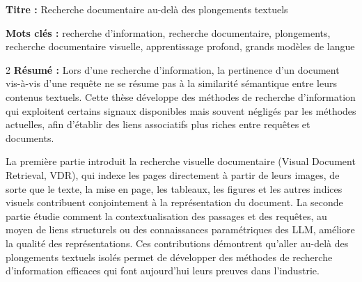 \begin{mdframed}[linecolor=Prune,linewidth=1]
\textbf{Titre :} Recherche documentaire au-delà des plongements textuels

\noindent \textbf{Mots clés :} recherche d'information, recherche documentaire, plongements, recherche documentaire visuelle, apprentissage profond, grands modèles de langue

\begin{multicols}{2}
\noindent \textbf{Résumé :} Lors d'une recherche d’information, la pertinence d’un document vis-à-vis d’une requête ne se résume pas à la similarité sémantique entre leurs contenus textuels. Cette thèse développe des méthodes de recherche d’information qui exploitent certains signaux disponibles mais souvent négligés par les méthodes actuelles, afin d’établir des liens associatifs plus riches entre requêtes et documents.

La première partie introduit la recherche visuelle documentaire (Visual Document Retrieval, VDR), qui indexe les pages directement à partir de leurs images, de sorte que le texte, la mise en page, les tableaux, les figures et les autres indices visuels contribuent conjointement à la représentation du document. La seconde partie étudie comment la contextualisation des passages et des requêtes, au moyen de liens structurels ou des connaissances paramétriques des LLM, améliore la qualité des représentations. Ces contributions démontrent qu’aller au-delà des plongements textuels isolés permet de développer des méthodes de recherche d'information efficaces qui font aujourd'hui leurs preuves dans l’industrie.
\end{multicols}
\end{mdframed}

\vspace{6mm}


